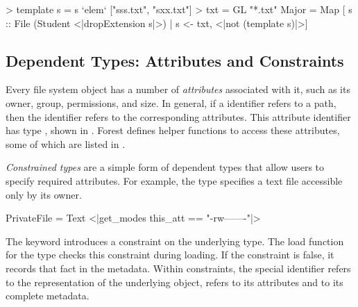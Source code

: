 \begin{code}
> template s = s `elem` ["sss.txt", "sxx.txt"]
> txt = GL "*.txt"
\mbox{}
 Major = Map
   [ s :: File (Student <|dropExtension s|>) 
   | s <-  txt, <|not (template s)|>]
\end{code}


\subsection{Dependent Types: Attributes and Constraints}
\label{sec:constraints}

Every file system object has a number of \textit{attributes} associated with
it, such as its owner, group, permissions, and size.  In general,
if a \forest{} identifier  refers to a path, 
then the identifier  refers to the
corresponding attributes.  This attribute identifier has type
, shown in . 
Forest defines
helper functions to access these attributes, some of which are listed
in .

\textit{Constrained types} are a simple form of dependent types that
allow users to specify required attributes. 
For example, the 
type  specifies a text file accessible only by its owner.
\begin{code}
 PrivateFile = 
 Text  <|get_modes this_att == "-rw-------"|>
\end{code}
The keyword  introduces a constraint on the underlying type.
The load function for the type  checks this
constraint during loading.  
If the constraint is false, it records that fact in the metadata.
Within constraints, the special identifier  refers to the representation 
of the underlying object,  refers to its attributes and  
to its complete metadata.


